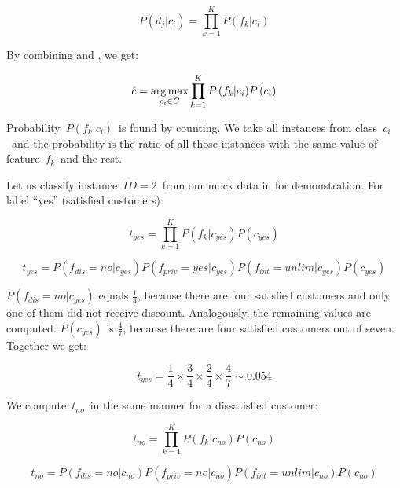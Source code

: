 \begin{equation}
	\label{eq:posterios}
	P\left(d_j  | c_i \right) = \prod_{k=1}^{K}
	{P\left(  f_k  | c_i \right)}
\end{equation}

By combining  and , we get:

\begin{equation}
	\hat{c} = \operatorname*{arg\,max}_{c_i \in C}
	\prod_{k=1}^{K}
	{P\left(  f_k  | c_i \right)}
	P\left( c_i \right)
\end{equation}

Probability~$P\left(f_k|c_i\right)$~is found by counting.
We take all instances from class~$c_i$~and the probability is the ratio of all those instances with the same value of feature~$f_k$~and the rest.

Let us classify instance~$\mathit{ID}=2$~from our mock data in  for demonstration.
For label ``yes'' (satisfied customers):

\begin{equation}
	t_{yes} = 
	\prod_{k=1}^{K}
	{P\left(  f_k  | c_{yes} \right)}
	P\left( c_{yes} \right)
\end{equation}

\begin{equation}
	t_{yes} = 
	P\left(  f_{dis} = no | c_{yes} \right)
	P\left(  f_{priv} = yes | c_{yes} \right)
	P\left(  f_{int} = unlim | c_{yes} \right)
	P\left( c_{yes} \right)
\end{equation}

$P\left(  f_{dis} = no | c_{yes} \right)$ equals $\frac{1}{4}$, because there are four satisfied customers
and only one of them did not receive discount.
Analogously, the remaining values are computed.
$P\left( c_{yes} \right)$ is $\frac{4}{7}$, because there are four satisfied customers out of seven.
Together we get:

\begin{equation}
	t_{yes} = 
	\frac{1}{4} \times
	\frac{3}{4} \times
	\frac{2}{4} \times
	\frac{4}{7}
	\sim 0.054
\end{equation}

We compute~$t_{no}$~in the same manner for a dissatisfied customer:

\begin{equation}
	t_{no} = 
	\prod_{k=1}^{K}
	{P\left(  f_k  | c_{no} \right)}
	P\left( c_{no} \right)
\end{equation}

\begin{equation}
	t_{no} = 
	P\left(  f_{dis} = no | c_{no} \right)
	P\left(  f_{priv} = no | c_{no} \right)
	P\left(  f_{int} = unlim | c_{no} \right)
	P\left( c_{no} \right)
\end{equation}

